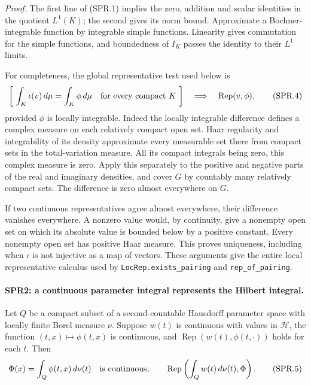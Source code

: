 \documentclass[11pt,a4paper]{article}
\numberwithin{equation}{section}
\theoremstyle{remark}\newtheorem{remark}[theorem]{Remark}
\begin{document}
\emph{Proof.}
The first line of (SPR.1) implies the zero, addition and scalar
identities in the quotient \(L^1(K)\); the second gives its norm
bound.  Approximate a Bochner-integrable function by integrable simple
functions.  Linearity gives commutation for the simple functions,
and boundedness of \(I_K\) passes the identity to their \(L^1\) limits.

For completeness, the global representative test used below is
\[
 \left[\ \int_K\iota(v)\,d\mu=\int_K\phi\,d\mu
           \quad\hbox{for every compact }K\ \right]
 \quad\Longrightarrow\quad \operatorname{Rep}(v,\phi),
 \tag{SPR.4}
\]
provided \(\phi\) is locally integrable.
Indeed the locally integrable difference defines a complex measure
on each relatively compact open set.  Haar regularity and
integrability of its density approximate every measurable set there
from compact sets in the total-variation measure.  All its compact
integrals being zero, this complex measure is zero.  Apply this
separately to the positive and negative parts of the real and
imaginary densities, and cover \(G\) by countably many relatively
compact sets.  The difference is zero almost everywhere on \(G\).

If two continuous representatives agree almost everywhere, their
difference vanishes everywhere.  A nonzero value would, by
continuity, give a nonempty open set on which its absolute value is
bounded below by a positive constant.  Every nonempty open set has
positive Haar measure.  This proves uniqueness, including when
\(\iota\) is not injective as a map of vectors.
These arguments give the entire local representative calculus used
by \texttt{LocRep.\allowbreak exists\_\allowbreak pairing} and \texttt{rep\_\allowbreak of\_\allowbreak pairing}.

\paragraph{SPR2: a continuous parameter integral represents the Hilbert integral.}
\label{claim:SPR2}
Let \(Q\) be a compact subset of a second-countable Hausdorff parameter
space with locally finite Borel measure \(\nu\).  Suppose \(w(t)\) is
continuous with values in \(\mathcal H\), the function
\((t,x)\mapsto\phi(t,x)\) is continuous, and
\(\operatorname{Rep}(w(t),\phi(t,\cdot))\) holds for each \(t\).
Then
\[
 \Phi(x)=\int_Q\phi(t,x)\,d\nu(t)
 \quad\hbox{is continuous},\qquad
 \operatorname{Rep}\left(\int_Qw(t)\,d\nu(t),\Phi\right).
 \tag{SPR.5}
\]
\end{document}

